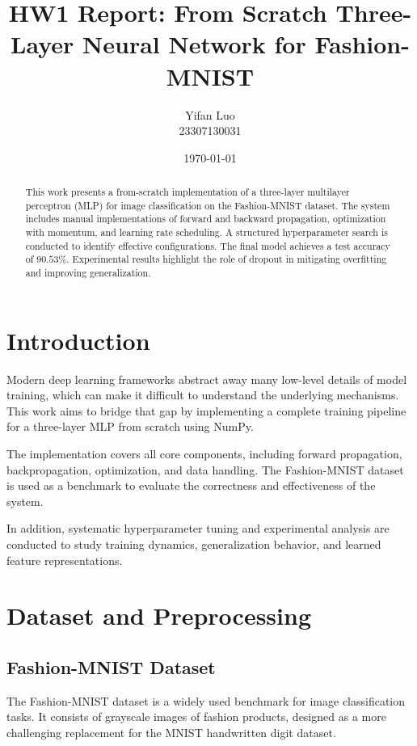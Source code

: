 \documentclass[11pt]{article}
\title{HW1 Report: From Scratch Three-Layer Neural Network for Fashion-MNIST}
\author{Yifan Luo \\ 23307130031}
\date{\today}
\begin{document}
\maketitle

\begin{abstract}
This work presents a from-scratch implementation of a three-layer multilayer perceptron (MLP) for image classification on the Fashion-MNIST dataset. The system includes manual implementations of forward and backward propagation, optimization with momentum, and learning rate scheduling. A structured hyperparameter search is conducted to identify effective configurations. The final model achieves a test accuracy of $90.53\%$. Experimental results highlight the role of dropout in mitigating overfitting and improving generalization.
\end{abstract}

\tableofcontents

\section{Introduction}

Modern deep learning frameworks abstract away many low-level details of model training, which can make it difficult to understand the underlying mechanisms. This work aims to bridge that gap by implementing a complete training pipeline for a three-layer MLP from scratch using NumPy.

The implementation covers all core components, including forward propagation, backpropagation, optimization, and data handling. The Fashion-MNIST dataset is used as a benchmark to evaluate the correctness and effectiveness of the system.

In addition, systematic hyperparameter tuning and experimental analysis are conducted to study training dynamics, generalization behavior, and learned feature representations.

\section{Dataset and Preprocessing}

\subsection{Fashion-MNIST Dataset}

The Fashion-MNIST dataset is a widely used benchmark for image classification tasks. It consists of grayscale images of fashion products, designed as a more challenging replacement for the MNIST handwritten digit dataset.
\end{document}
